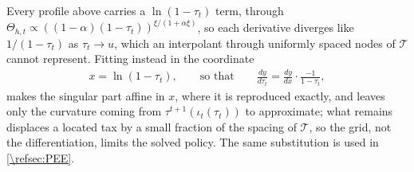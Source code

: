 Every profile above carries a $\ln(1-\tau_t)$ term, through $\Theta_{h,t}\propto\left((1-\alpha)(1-\tau_t)\right)^{\xi/(1+\alpha\xi)}$, so each derivative diverges like $1/(1-\tau_t)$ as $\tau_t\rightarrow u$, which an interpolant through uniformly spaced nodes of $\mathcal{T}$ cannot represent. Fitting instead in the coordinate
\begin{align*}
    x = \ln\left(1-\tau_t\right), \qquad\text{so that}\qquad \frac{dy}{d\tau_t} = \frac{dy}{dx}\cdot\frac{-1}{1-\tau_t},
\end{align*}
makes the singular part affine in $x$, where it is reproduced exactly, and leaves only the curvature coming from $\tau^{t+1}\left(\iota_t(\tau_t)\right)$ to approximate; what remains displaces a located tax by a small fraction of the spacing of $\mathcal{T}$, so the grid, not the differentiation, limits the solved policy. The same substitution is used in \cref{\refsec:PEE}.

